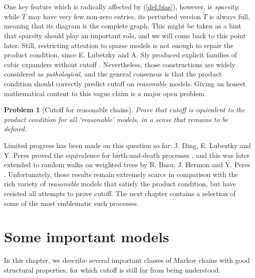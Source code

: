 \documentclass[12pt,final]{article}
\newtheorem{problem}{Problem}[section]
\numberwithin{equation}{section}
\begin{document}
 One  key feature which is radically affected by (\ref{def:bias}), however, is \emph{sparsity}: while  $T$ may have  very few non-zero entries, its perturbed version $\widetilde{T}$ is always full, meaning that its diagram is the complete graph. This might be taken as a hint that sparsity should play an important role, and we will come back to this point later. Still, restricting attention to sparse models is not enough to repair the product condition, since E. Lubetzky and A. Sly produced explicit families of cubic expanders without cutoff \cite{MR2774096}. Nevertheless, those constructions are widely considered as \emph{pathological}, and the general consensus is that the product condition should correctly predict cutoff on \emph{reasonable} models. Giving an honest mathematical content to this vague claim is a major open problem.
\begin{problem}[Cutoff for reasonable chains]\label{pb:PC}Prove that  cutoff  is equivalent to the product condition for all `reasonable' models, in a sense that remains to be defined.
\end{problem}
Limited progress has been made on this question so far: J. Ding, E. Lubeztky and Y. Peres proved the equivalence for birth-and-death processes \cite{ding2010total}, and this was later extended to random walks on weighted trees by R. Basu, J. Hermon and Y. Peres \cite{MR3650406}. Unfortunately, those results remain extremely scarce in comparison with the rich variety of \emph{reasonable} models that satisfy the product condition, but have resisted all attempts to prove cutoff. The next chapter contains a selection of some of the most emblematic such processes. 


\newpage
\section{Some important models}
\label{sec:models}
In this chapter, we describe several important classes of Markov chains with good structural properties, for which cutoff is still far from being understood. 
\end{document}
